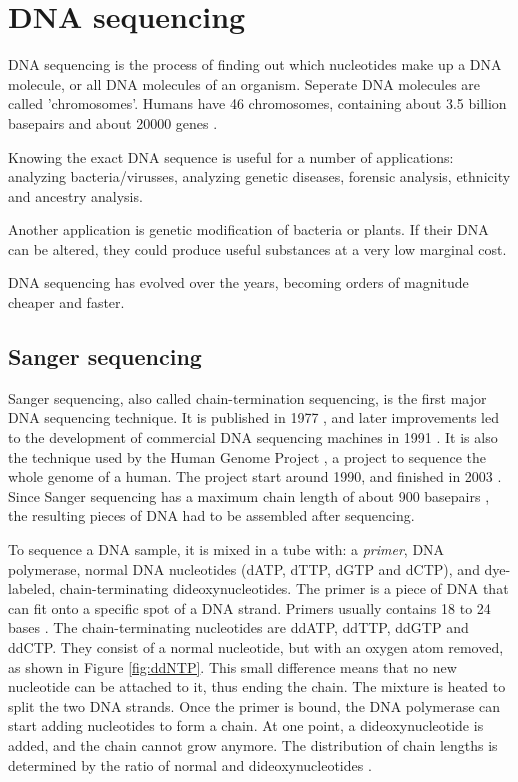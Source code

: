\documentclass[../main/thesis.tex]{subfiles}
\begin{document}
\section{DNA sequencing}
DNA sequencing is the process of finding out which nucleotides make up a DNA molecule, or all DNA molecules of an organism.
Seperate DNA molecules are called 'chromosomes'.
Humans have 46 chromosomes, containing about 3.5 billion basepairs \cite{DNA_human_stats} and about 20000 genes \cite{human_genes}.

Knowing the exact DNA sequence is useful for a number of applications: analyzing bacteria/virusses, analyzing genetic diseases, forensic analysis, ethnicity and ancestry analysis.

Another application is genetic modification of bacteria or plants.
If their DNA can be altered, they could produce useful substances at a very low marginal cost.

DNA sequencing has evolved over the years, becoming orders of magnitude cheaper and faster.

\subsection{Sanger sequencing}
Sanger sequencing, also called chain-termination sequencing, is the first major DNA sequencing technique.
It is published in 1977 \cite{Sanger}, and later improvements led to the development of commercial DNA sequencing machines in 1991 \cite{history_sequencing}.
It is also the technique used by the Human Genome Project \cite{sanger_sequencing2}, a project to sequence the whole genome of a human.
The project start around 1990, and finished in 2003 \cite{human_genome_project}.
Since Sanger sequencing has a maximum chain length of about 900 basepairs \cite{sanger_sequencing2}, the resulting pieces of DNA had to be assembled after sequencing.

To sequence a DNA sample, it is mixed in a tube with: a \textit{primer}, DNA polymerase, normal DNA nucleotides (dATP, dTTP, dGTP and dCTP), and dye-labeled, chain-terminating dideoxynucleotides.
The primer is a piece of DNA that can fit onto a specific spot of a DNA strand.
Primers usually contains 18 to 24 bases \cite{sanger_primer_size}.
The chain-terminating nucleotides are ddATP, ddTTP, ddGTP and ddCTP.
They consist of a normal nucleotide, but with an oxygen atom removed, as shown in Figure \ref{fig:ddNTP}.
This small difference means that no new nucleotide can be attached to it, thus ending the chain.
The mixture is heated to split the two DNA strands.
Once the primer is bound, the DNA polymerase can start adding nucleotides to form a chain.
At one point, a dideoxynucleotide is added, and the chain cannot grow anymore.
The distribution of chain lengths is determined by the ratio of normal and dideoxynucleotides \cite{sanger_ratio}.
\end{document}
